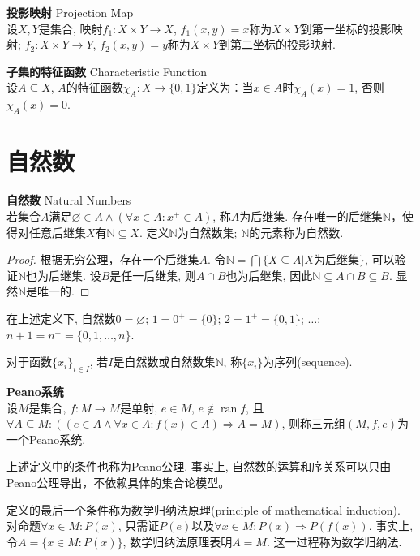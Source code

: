 \begin{dfn} \textbf{投影映射} Projection Map\\
设$X,Y$是集合, 映射$f_1:X\times Y\to X$, $f_1(x,y)=x$称为$X\times Y$到第一坐标的投影映射; $f_2:X\times Y\to Y$, $f_2(x,y)=y$称为$X\times Y$到第二坐标的投影映射.
\end{dfn}

\begin{dfn} \textbf{子集的特征函数} Characteristic Function\\
设$A\subseteq X$, $A$的特征函数$\chi_A:X\to \{0,1\}$定义为：当$x\in A$时$\chi_A(x)=1$, 否则$\chi_A(x)=0$.
\end{dfn}

\section{自然数}

\begin{pro} \textbf{自然数} Natural Numbers\\
若集合$A$满足$\varnothing \in A \land (\forall x\in A : x^+ \in A)$, 称$A$为后继集. 存在唯一的后继集$\mathbb{N}$，使得对任意后继集$X$有$\mathbb{N}\subseteq X$. 定义$\mathbb{N}$为自然数集; $\mathbb{N}$的元素称为自然数. 
\label{pro:natural_numbers}
\end{pro}
\begin{proof}
根据无穷公理，存在一个后继集$A$. 令$\mathbb{N}=\bigcap\{X\subseteq A\vert X\text{为后继集}\}$, 可以验证$\mathbb{N}$也为后继集. 设$B$是任一后继集, 则$A\cap B$也为后继集, 因此$\mathbb{N}\subseteq A\cap B \subseteq B$. 显然$\mathbb{N}$是唯一的. 
\end{proof}
\par 在上述定义下, 自然数$0=\varnothing$; $1=0^+=\{0\}$; $2=1^+=\{0, 1\}$; $\dots$; $n+1=n^+=\{0,1,\dots,n\}$. 
\par 对于函数$\{x_i\}_{i\in I}$, 若$I$是自然数或自然数集$\mathbb{N}$, 称$\{x_i\}$为序列(sequence). 

\begin{dfn}\textbf{Peano系统}\\
设$M$是集合, $f:M\to M$是单射, $e\in M$, $e \notin \operatorname{ran}f$, 且$\forall A\subseteq M: ((e\in A\land \forall x\in A: f(x) \in A) \Rightarrow A=M)$, 则称三元组$(M,f,e)$为一个Peano系统. 
\end{dfn}
\par 上述定义中的条件也称为Peano公理. 事实上, 自然数的运算和序关系可以只由Peano公理导出，不依赖具体的集合论模型。

\par 定义的最后一个条件称为数学归纳法原理(principle of mathematical induction). 对命题$\forall x\in M: P(x)$, 只需证$P(e)$以及$ \forall x\in M: P(x)\Rightarrow P(f(x))$. 事实上, 令$A=\{x\in M: P(x)\}$, 数学归纳法原理表明$A=M$. 这一过程称为数学归纳法.

